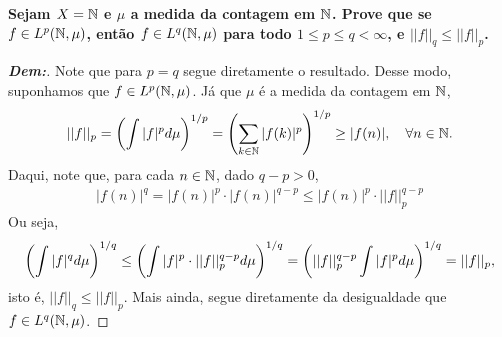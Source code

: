 \textbf{Sejam $X = \mathbb N$ e $\mu$ a medida da contagem em $\mathbb N$. 
Prove que se $f \in L^p(\mathbb N, \mu)$, então $f \in L^q(\mathbb N, \mu)$ para todo $1 \le p \le q < \infty$, 
e $||f||_q \le ||f||_p$.}
\begin{proof}[\textbf{Dem:}] Note que para $p = q$ segue diretamente o resultado. 
  Desse modo, suponhamos que $f \in L^p(\mathbb N, \mu)$. Já que $\mu$ é a medida da contagem 
  em $\mathbb N$, 
  \begin{align*}
    ||f||_p = \left(\int |f|^p d\mu\right)^{1/p} = \left(\sum_{k \in \mathbb N} |f(k)|^p\right)^{1/p}
    \ge |f(n)|, \quad \forall n \in \mathbb N.
  \end{align*}
  Daqui, note que, para cada $n \in \mathbb N$, dado $q-p > 0$, 
  \begin{align*}
    |f(n)|^q = |f(n)|^p\cdot |f(n)|^{q-p} \le |f(n)|^p \cdot ||f||_p^{q-p}
  \end{align*}
  Ou seja, 
  \begin{align*}
    \left(\int |f|^q d\mu\right)^{1/q} \le \left(\int |f|^p\cdot ||f||_p^{q-p} d\mu\right)^{1/q}
    = \left(||f||_p^{q-p}\int |f|^pd\mu\right)^{1/q} = ||f||_p,
  \end{align*}
  isto é, $||f||_q \le ||f||_p$. Mais ainda, segue diretamente da desigualdade 
  que $f \in L^q(\mathbb N, \mu)$.

\end{proof}

